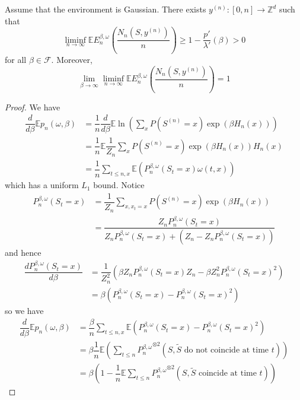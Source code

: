 \begin{theorem}
    Assume that the environment is Gaussian. There exists $y^{(n)}:[0,n] \to\mathbb{Z}^d$ such that
    \[
    \liminf_{n\to\infty} \mathbb{E}E_n^{\beta,\omega}\left(\dfrac{N_n(S,y^{(n)})}{n}\right) \geq 1 - \dfrac{p'}{\lambda'}(\beta) > 0
    \]
    for all $\beta \in \mathcal{F}$. Moreover,
    \[
    \lim_{\beta\to\infty} \liminf_{n\to\infty} \mathbb{E}E_n^{\beta,\omega}\left(\dfrac{N_n(S,y^{(n)})}{n}\right) = 1
    \]
\end{theorem}
\begin{proof}
    We have
    \[
    \begin{aligned}
    \dfrac{d}{d\beta}\mathbb{E}p_n(\omega,\beta) &= \dfrac{1}{n}\dfrac{d}{d\beta}\mathbb{E}\ln\left(\sum\limits_{x}P(S^{(n)} = x) \exp(\beta H_n(x))\right) \\
    & = \dfrac{1}{n}\mathbb{E}\dfrac{1}{Z_n}\sum\limits_{x}P(S^{(n)} = x)\exp(\beta H_n(x))H_n(x) \\
    &= \dfrac{1}{n}\sum\limits_{t\leq n,x}\mathbb{E}\left(P_n^{\beta,\omega}(S_t = x)\omega(t,x)\right)
    \end{aligned}
    \]
    which has a uniform $L_1$ bound. Notice
    \[
    \begin{aligned}
    P_n^{\beta,\omega}(S_t = x) &= \dfrac{1}{Z_n}\sum\limits_{x, x_t = x}P(S^{(n)} = x)\exp(\beta H_n(x)) \\ &= \dfrac{Z_nP_n^{\beta,\omega}(S_t = x)}{Z_nP_n^{\beta,\omega}(S_t = x)+(Z_n - Z_nP_n^{\beta,\omega}(S_t = x))} 
    \end{aligned}
    \]
    and hence
    \[
    \begin{aligned}
        \dfrac{dP_n^{\beta,\omega}(S_t = x)}{d\beta} &= \dfrac{1}{Z_n^2}\left(\beta Z_n P_n^{\beta,\omega}(S_t = x)Z_n - \beta Z_n^2P_n^{\beta,\omega}(S_t = x)^2\right) \\
        & = \beta(P_n^{\beta,\omega}(S_t = x)-P_n^{\beta,\omega}(S_t = x)^2)
    \end{aligned}
    \]
    so we have
    \[
    \begin{aligned}
    \dfrac{d}{d\beta}\mathbb{E}p_n(\omega,\beta) &= \dfrac{\beta}{n} \sum\limits_{t\leq n, x} \mathbb{E}(P_n^{\beta,\omega}(S_t = x)-P_n^{\beta,\omega}(S_t = x)^2) \\
    &=\beta\dfrac{1}{n}\mathbb{E}(\sum\limits_{t\leq n} {P_n^{\beta,\omega}}^{\otimes 2}(S,\tilde{S}\text{ do not coincide at time }t)) \\
    & = \beta(1 - \dfrac{1}{n}\mathbb{E}\sum\limits_{t\leq n}{ P_n^{\beta,\omega}}^{\otimes 2}(S,\tilde{S}\text{ coincide at time }t))   

\end{aligned}\]
\end{proof}
